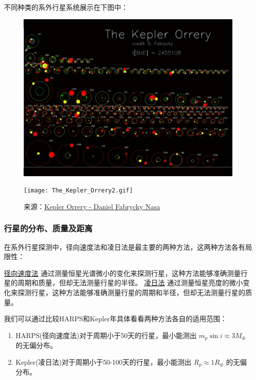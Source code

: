 \documentclass[letterpaper,10pt,english]{sphinxmanual}
\begin{document}
不同种类的系外行星系统展示在下图中：
\begin{figure}[htbp]
\centering

\includegraphics{The_Kepler_Orrery.gif}
\end{figure}
\begin{figure}[htbp]
\centering
\capstart

\texttt{[image: The\_Kepler\_Orrery2.gif]}
\caption{来源：\href{http://kepler.nasa.gov/multimedia/animations/scienceconcepts/?ImageID=136}{Kepler Orrery - Daniel Fabrycky \textbar{} Nasa}}\end{figure}


\subsubsection{行星的分布、质量及距离}
\label{statistics:id7}
在系外行星探测中，径向速度法和凌日法是最主要的两种方法，这两种方法各有局限性：

\href{http://exoplanets.readthedocs.org/zh\_CN/latest/detection.html\#id2}{径向速度法} 通过测量恒星光谱微小的变化来探测行星，这种方法能够准确测量行星的周期和质量，但却无法测量行星的半径。 \href{http://exoplanets.readthedocs.org/zh\_CN/latest/detection.html\#id7}{凌日法} 通过测量恒星亮度的微小变化来探测行星，这种方法能够准确测量行星的周期和半径，但却无法测量行星的质量。

我们可以通过比较HARPS和Kepler年具体看看两种方法各自的适用范围：
\begin{enumerate}
\item {} 
HARPS(径向速度法)对于周期小于50天的行星，最小能测出 \(m_p \sin i \approx 3M_{\oplus}\) 的无偏分布。

\item {} 
Kepler(凌日法)对于周期小于50-100天的行星，最小能测出 \(R_p \approx 1R_{\oplus}\) 的无偏分布。

\end{enumerate}
\end{document}
